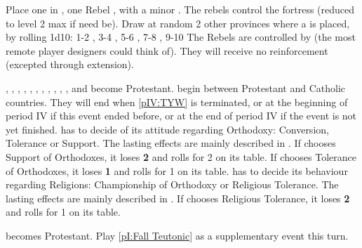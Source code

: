 

\phevnt
\aparag Place one \REVOLT\facemoins in \provinceToledo, one Rebel
\ARMY\facemoins, \LD with a minor \LeaderG. The rebels control the fortress
(reduced to level 2 max if need be).
\aparag Draw at random 2 other provinces where a \REVOLT\facemoins is placed,
by rolling 1d10: 1-2 , 3-4 ,
5-6 \provinceSalamanca, 7-8 \provinceLeon, 9-10 
\aparag The Rebels are controlled by \RUS (the most remote player designers
could think of).  They will receive no reinforcement (excepted through \REVOLT
extension).






\phevnt
{} \paysDanemark, \paysSuede, \paysBerg, \paysSuisse,
\paysHanse, \paysprovincesne, \paysHesse, \paysSaxe, \paysHanovre,
\paysOldenburg, \paysBrunswick, and \paysBoheme become Protestant.
\aparag {} begin between Protestant and Catholic
countries. They will end when \ref{pIV:TYW} is terminated, or at the beginning
of period IV if this event ended before, or at the end of period IV if the
event is not yet finished.
 \POL has to decide of its attitude regarding
Orthodoxy: Conversion, Tolerance or Support.
\bparag The lasting effects are mainly described in
.
\bparag If \POL chooses Support of Orthodoxes, it loses {\bf 2} \STAB and
rolls for 2 \REVOLT on its table.
\bparag If \POL chooses Tolerance of Orthodoxes, it loses {\bf 1} \STAB and
rolls for 1 \REVOLT on its table.
 \RUS has to decide its behaviour regarding
Religions: Championship of Orthodoxy or Religious Tolerance.
\bparag The lasting effects are mainly described in
.
\bparag If \RUS chooses Religious Tolerance, it loses {\bf 2} \STAB and rolls
for 1 \REVOLT on its table.


\phevnt
\aparag \paysBrandebourg becomes Protestant. Play \ref{pI:Fall Teutonic} as a
supplementary event this turn.




